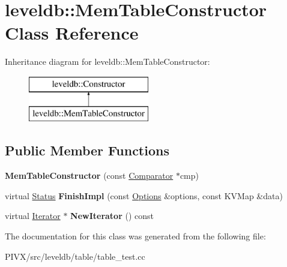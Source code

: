\hypertarget{classleveldb_1_1_mem_table_constructor}{}\section{leveldb\+:\+:Mem\+Table\+Constructor Class Reference}
\label{classleveldb_1_1_mem_table_constructor}
Inheritance diagram for leveldb\+:\+:Mem\+Table\+Constructor\+:\begin{figure}[H]
\begin{center}
\leavevmode
\includegraphics[height=2.000000cm]{classleveldb_1_1_mem_table_constructor}
\end{center}
\end{figure}
\subsection*{Public Member Functions}
\begin{DoxyCompactItemize}
\item 
\mbox{\label{classleveldb_1_1_mem_table_constructor_a5f4c341eb97e6e3938ec05b98455664a}} 
{\bfseries Mem\+Table\+Constructor} (const \mbox{\hyperlink{structleveldb_1_1_comparator}{Comparator}} $\ast$cmp)
\item 
\mbox{\label{classleveldb_1_1_mem_table_constructor_a78851e48bd187f231934e128ab050624}} 
virtual \mbox{\hyperlink{classleveldb_1_1_status}{Status}} {\bfseries Finish\+Impl} (const \mbox{\hyperlink{structleveldb_1_1_options}{Options}} \&options, const K\+V\+Map \&data)
\item 
\mbox{\label{classleveldb_1_1_mem_table_constructor_ab3f90c7f0c8f8b3b917ddf587290ff29}} 
virtual \mbox{\hyperlink{classleveldb_1_1_iterator}{Iterator}} $\ast$ {\bfseries New\+Iterator} () const
\end{DoxyCompactItemize}


The documentation for this class was generated from the following file\+:\begin{DoxyCompactItemize}
\item 
P\+I\+V\+X/src/leveldb/table/table\+\_\+test.\+cc\end{DoxyCompactItemize}
